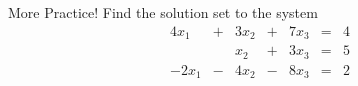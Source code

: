 \documentclass[xcoler=dvipsnames, aspectratio=169]{beamer}
\begin{document}
    \begin{frame}{More Practice!}
        \small
        Find the solution set to the  system
        \begin{alignat*}{4}
            x_1 &+& 3x_2 &+& 7x_3 &=& 4\\
                &\,&x_2 &+& 3x_3 &=& 5\\
            -2x_1 &-& 4x_2 &-& 8x_3 &=& 2
        \end{alignat*}
        \iftoggle{showSolutions}{
            \pause
            \[
                \aMat{ccc|c}{
                    1&3&7&4\\
                    0&1&3&5\\
                   -2&-4&-8&2
                }\pause\rightarrow\aMat{ccc|c}{
                    1&3&7&4\\
                    0&1&3&5\\
                    0&2&6&10
                }\pause\rightarrow\aMat{ccc|c}{
                    1&3&7&4\\
                    0&1&3&5\\
                    0&0&0&0
                }\pause\rightarrow\aMat{ccc|c}{
                    1&0&-2&-11\\
                    0&1&3&5\\
                    0&0&0&0
                }
            \]
            Which can be written as
            \[
                \vec{x} = \begin{bmatrix}
                    x_1\\x_2\\x_3
                \end{bmatrix}\pause = \begin{bmatrix}
                    -11+2x_3\\5-3x_3\\x_3
                \end{bmatrix}\pause = \begin{bmatrix}
                    -11\\5\\0
                \end{bmatrix} + x_3\begin{bmatrix}
                    2\\-3\\1
                \end{bmatrix}\pause = \vec{p} + t\vec{v} (t\in\R)
            \]
        }{
            \vspace{120pt}
        }
    \end{frame}
\end{document}
